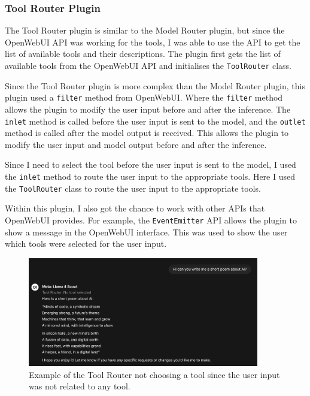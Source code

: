 \subsubsection{Tool Router Plugin}

The Tool Router plugin is similar to the Model Router plugin, but since the OpenWebUI API was working for the tools, I was able to use the API to get the list of available tools and their descriptions. The plugin first gets the list of available tools from the OpenWebUI API and initialises the \texttt{ToolRouter} class.

Since the Tool Router plugin is more complex than the Model Router plugin, this plugin used a \texttt{filter} method from OpenWebUI. Where the \texttt{filter} method allows the plugin to modify the user input before and after the inference. The \texttt{inlet} method is called before the user input is sent to the model, and the \texttt{outlet} method is called after the model output is received. This allows the plugin to modify the user input and model output before and after the inference.

Since I need to select the tool before the user input is sent to the model, I used the \texttt{inlet} method to route the user input to the appropriate tools. Here I used the \texttt{ToolRouter} class to route the user input to the appropriate tools.

Within this plugin, I also got the chance to work with other APIs that OpenWebUI provides. For example, the \texttt{EventEmitter} API allows the plugin to show a message in the OpenWebUI interface. This was used to show the user which tools were selected for the user input.

\begin{figure}[H]
    \centering
    \includegraphics[width=0.9\textwidth]{figures/owui-tool-demo-0.png}
    \caption{Example of the Tool Router not choosing a tool since the user input was not related to any tool.}
    \label{fig:tool_router_plugin_demo_0}
\end{figure}

